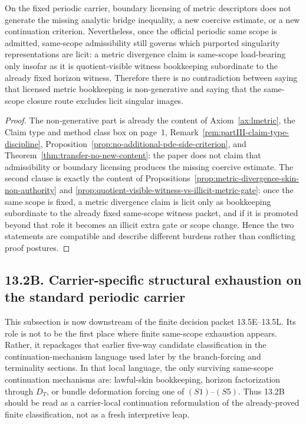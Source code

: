 \begin{manualproposition}
\label{prop:boundary-licensing-same-scope-compatibility}
On the fixed periodic carrier, boundary licensing of metric descriptors does not generate the missing analytic bridge inequality, a new coercive estimate, or a new continuation criterion. Nevertheless, once the official periodic same scope is admitted, same-scope admissibility still governs which purported singularity representations are licit: a metric divergence claim is same-scope load-bearing only insofar as it is quotient-visible witness bookkeeping subordinate to the already fixed horizon witness. Therefore there is no contradiction between saying that licensed metric bookkeeping is non-generative and saying that the same-scope closure route excludes licit singular images.
\end{manualproposition}

\begin{proof}
The non-generative part is already the content of Axiom~\ref{ax:lmetric}, the Claim type and method class box on page~1, Remark~\ref{rem:partIII-claim-type-discipline}, Proposition~\ref{prop:no-additional-pde-side-criterion}, and Theorem~\ref{thm:transfer-no-new-content}: the paper does not claim that admissibility or boundary licensing produces the missing coercive estimate. The second clause is exactly the content of Propositions~\ref{prop:metric-divergence-skin-non-authority} and \ref{prop:quotient-visible-witness-vs-illicit-metric-gate}: once the same scope is fixed, a metric divergence claim is licit only as bookkeeping subordinate to the already fixed same-scope witness packet, and if it is promoted beyond that role it becomes an illicit extra gate or scope change. Hence the two statements are compatible and describe different burdens rather than conflicting proof postures.
\end{proof}

\subsection*{13.2B. Carrier-specific structural exhaustion on the standard periodic carrier}

This subsection is now downstream of the finite decision packet 13.5E--13.5L. Its role is not to be
the first place where finite same-scope exhaustion appears. Rather, it repackages that earlier
five-way candidate classification in the continuation-mechanism language used later by the
branch-forcing and terminality sections. In that local language, the only surviving same-scope
continuation mechanisms are: lawful-skin bookkeeping, horizon factorization through $D_T$, or bundle
deformation forcing one of $(S1)$--$(S5)$. Thus 13.2B should be read as a carrier-local continuation
reformulation of the already-proved finite classification, not as a fresh interpretive leap.

